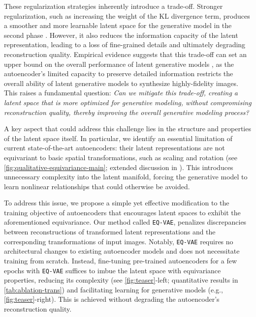 These regularization strategies inherently introduce a trade-off. Stronger regularization, such as increasing the weight of the KL divergence term, produces a smoother and more learnable latent space for the generative model in the second phase \cite{tschannen2025givt}. 
However, it also reduces the information capacity of the latent representation, leading to a loss of fine-grained details and ultimately degrading reconstruction quality. Empirical evidence suggests that this trade-off can set an upper bound on the overall performance of latent generative models \cite{rombach2022high}, as the autoencoder’s limited capacity to preserve detailed information restricts the overall ability of latent generative models to synthesize highly-fidelity images. This raises a fundamental question:  
\emph{Can we mitigate this trade-off, creating a latent space that is more optimized for generative modeling, without compromising reconstruction quality, thereby improving the overall generative modeling process?}

A key aspect that could address this challenge lies in the structure and properties of the latent space itself. In particular, we identify an essential limitation of current state-of-the-art autoencoders: their latent representations are not equivariant to basic spatial transformations, such as scaling and rotation (see \autoref{fig:qualitative-equivariance-main}; extended discussion in ).
This introduces unnecessary complexity into the latent manifold, forcing the generative model to learn nonlinear relationships that could otherwise be avoided.

To address this issue, we propose a simple yet effective modification to the training objective of autoencoders that encourages latent spaces to exhibit the aforementioned equivariance.
Our method called \texttt{EQ-VAE}, penalizes discrepancies between reconstructions of transformed latent representations and the corresponding transformations of input images. Notably, \texttt{EQ-VAE} requires no architectural changes to existing autoencoder models and does not necessitate training from scratch. 
Instead, fine-tuning pre-trained autoencoders for a few epochs with \texttt{EQ-VAE} suffices to imbue the latent space with equivariance properties, reducing its complexity (see \autoref{fig:teaser}-left; quantitative results in \autoref{tab:ablation-trans}) and facilitating learning for generative models (e.g., \autoref{fig:teaser}-right). %
This is achieved without degrading the autoencoder’s reconstruction quality.


